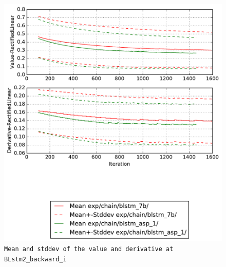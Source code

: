 \documentclass[prl,10pt,twocolumn]{revtex4}
\begin{document}
\newpage
\begin{figure}[h]
  \begin{center}
    \caption{\texttt{Mean and stddev of the value and derivative at BLstm2\_backward\_i}}
    \includegraphics[width=\textwidth]{exp/chain/blstm_7b/report/nonlinstats_BLstm2_backward_i.pdf}
  \end{center}
\end{figure}
\clearpage
\end{document}
